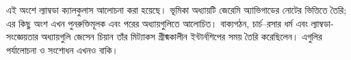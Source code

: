 \documentclass[../../include/open-logic-part]{subfiles}
\begin{document}

\begin{editorial}
এই অংশে ল্যাম্বডা ক্যালকুলাস আলোচনা করা হয়েছে। ভূমিকা অধ্যায়টি জেরেমি
অ্যাভিগাডের নোটের ভিত্তিতে তৈরি; এর কিছু অংশ এখন পুনরুক্তিমূলক এবং পরের
অধ্যায়গুলিতে আলোচিত। বাক্যগঠন, চার্চ--রসার ধর্ম এবং ল্যাম্বডা-সংজ্ঞেয়তার
অধ্যায়গুলি জেসেন চিয়ান তাঁর মিট্যাকস গ্রীষ্মকালীন ইন্টার্নশিপের সময় তৈরি
করেছিলেন। এগুলির পর্যালোচনা ও সংশোধন এখনও বাকি।
\end{editorial}





\OLEndPartHook
\end{document}
